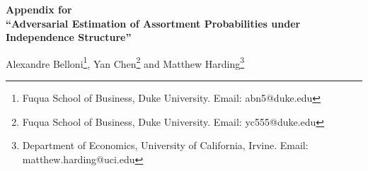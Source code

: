 \documentclass[11pt]{article}
\begin{document}



\def\spacingset#1{\renewcommand{\baselinestretch}%
{#1}\small\normalsize} \spacingset{1}
\onehalfspacing
\begin{center}
\textbf{\Large{}{}Appendix for\\ ``Adversarial Estimation of Assortment Probabilities under Independence Structure''}
{\Large{} }{\Large\par}
\par\end{center}

\begin{center}
Alexandre Belloni\footnote{Fuqua School of Business, Duke University. Email: abn5@duke.edu}, Yan Chen\footnote{Fuqua School of Business, Duke University. Email: yc555@duke.edu} and Matthew Harding\footnote{Department of Economics,
University of California, Irvine. Email: matthew.harding@uci.edu}
{\Large{} }{\Large\par}
\par\end{center}

\onehalfspacing
\end{document}

